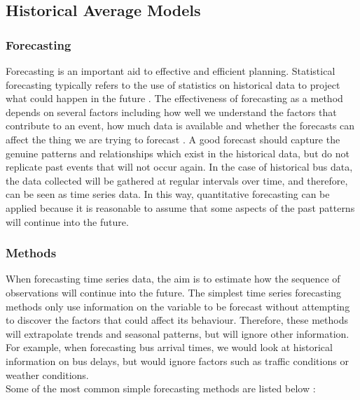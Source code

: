 \documentclass[12pt, a4paper]{article}
\begin{document}
\subsection{Historical Average Models}
\label{historical-avg-models}

\subsubsection{Forecasting}
Forecasting is an important aid to effective and efficient planning. Statistical forecasting typically refers to the use of statistics on historical data to project what could happen in the future \cite{what-is-forecasting}. The effectiveness of forecasting as a method depends on several factors including how well we understand the factors that contribute to an event, how much data is available and whether the forecasts can affect the thing we are trying to forecast \cite{forecasting-book}. A good forecast should capture the genuine patterns and relationships which exist in the historical data, but do not replicate past events that will not occur again. In the case of historical bus data, the data collected will be gathered at regular intervals over time, and therefore, can be seen as time series data. In this way, quantitative forecasting can be applied because it is reasonable to assume that some aspects of the past patterns will continue into the future.

\subsubsection{Methods}

When forecasting time series data, the aim is to estimate how the sequence of observations will continue into the future. The simplest time series forecasting methods only use information on the variable to be forecast without attempting to discover the factors that could affect its behaviour. Therefore, these methods will extrapolate trends and seasonal patterns, but will ignore other information. For example, when forecasting bus arrival times, we would look at historical information on bus delays, but would ignore factors such as traffic conditions or weather conditions. \\

Some of the most common simple forecasting methods are listed below \cite{forecasting-book}:
\end{document}
